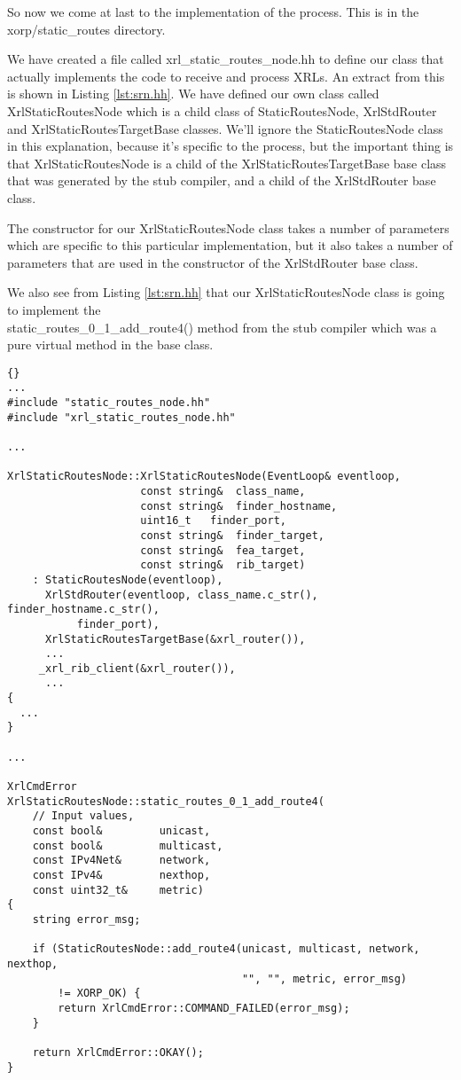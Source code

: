 \documentclass[11pt]{article}
\begin{document}
So now we come at last to the implementation of the \SRI process.
This is in the \\
{\stt xorp/static\_routes} directory.  

We have created a file called {\stt xrl\_static\_routes\_node.hh} to
define our class that actually implements the code to receive and
process XRLs.  An extract from this is shown in Listing
\ref{lst:srn.hh}.  We have defined our own class called {\stt
XrlStaticRoutesNode} which is a child class of {\stt
StaticRoutesNode}, {\stt XrlStdRouter} and {\stt XrlStaticRoutesTargetBase}
classes.  We'll
ignore the {\stt StaticRoutesNode} class in this explanation, because
it's specific to the \SRI process, but the important thing is that
{\stt XrlStaticRoutesNode} is a child of the {\stt
XrlStaticRoutesTargetBase} base class that was generated by the stub
compiler, and a child of the {\stt XrlStdRouter} base class.

The constructor for our {\stt XrlStaticRoutesNode} class takes a
number of parameters which are specific to this particular
implementation, but it also takes a number of parameters that are used
in the constructor of the {\stt XrlStdRouter} base class.

We also see from Listing \ref{lst:srn.hh} that our {\stt
XrlStaticRoutesNode} class is going to implement the \\ {\stt
static\_routes\_0\_1\_add\_route4()} method from the stub compiler
which was a pure virtual method in the base class.

\newpage

\begin{lstlisting}[caption={Extracts from {\stt xorp/static\_routes/xrl\_static\_routes\_node.cc} %
                                     \label{lst:srn.cc} } ]{}
...
#include "static_routes_node.hh"
#include "xrl_static_routes_node.hh"

...

XrlStaticRoutesNode::XrlStaticRoutesNode(EventLoop&	eventloop,
					 const string&	class_name,
					 const string&	finder_hostname,
					 uint16_t	finder_port,
					 const string&	finder_target,
					 const string&	fea_target,
					 const string&	rib_target)
    : StaticRoutesNode(eventloop),
      XrlStdRouter(eventloop, class_name.c_str(), finder_hostname.c_str(),
		   finder_port),
      XrlStaticRoutesTargetBase(&xrl_router()),
      ...
     _xrl_rib_client(&xrl_router()),
      ...
{
  ...
}

...

XrlCmdError
XrlStaticRoutesNode::static_routes_0_1_add_route4(
    // Input values,
    const bool&         unicast,
    const bool&         multicast,
    const IPv4Net&      network,
    const IPv4&         nexthop,
    const uint32_t&     metric)
{
    string error_msg;

    if (StaticRoutesNode::add_route4(unicast, multicast, network, nexthop,
                                     "", "", metric, error_msg)
        != XORP_OK) {
        return XrlCmdError::COMMAND_FAILED(error_msg);
    }

    return XrlCmdError::OKAY();
}
\end{lstlisting}
\end{document}
